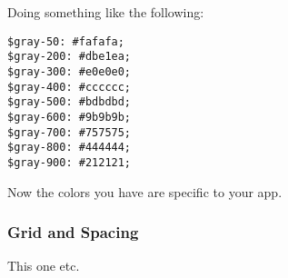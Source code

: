 Doing something like the following:
\begin{lstlisting}
$gray-50: #fafafa;
$gray-200: #dbe1ea;
$gray-300: #e0e0e0;
$gray-400: #cccccc;
$gray-500: #bdbdbd;
$gray-600: #9b9b9b;
$gray-700: #757575;
$gray-800: #444444;
$gray-900: #212121;
\end{lstlisting}

Now the colors you have are specific to your app.

\subsubsection{ Grid and Spacing }
This one etc.
